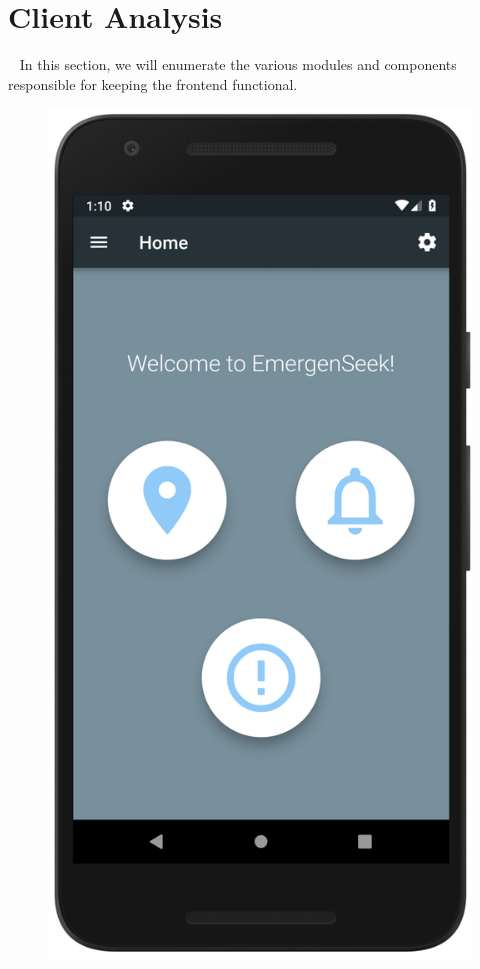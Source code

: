 \documentclass[10pt, a4paper]{article}
\begin{document}
\section{Client Analysis}
\par ~ In this section, we will enumerate the various modules and components responsible for keeping the frontend functional.


\begin{figure}[H]
  \includegraphics[width=\linewidth]{demo_home.png}

\end{figure}
\end{document}
